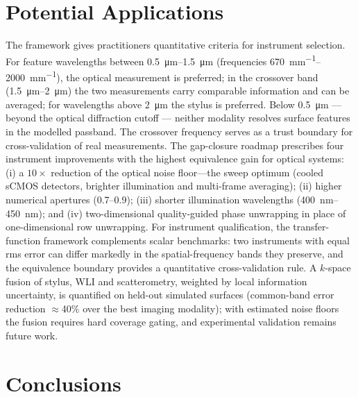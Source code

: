 \documentclass{imeko_wc}
\begin{document}
\section{Potential Applications}

\label{sec:applications}
The framework gives practitioners quantitative criteria for instrument selection. For feature wavelengths between \qtyrange{0.5}{1.5}{\micro\metre} (frequencies \qtyrange{670}{2000}{mm^{-1}}), the optical measurement is preferred; in the crossover band (\qtyrange{1.5}{2}{\micro\metre}) the two measurements carry comparable information and can be averaged; for wavelengths above \qty{2}{\micro\metre} the stylus is preferred. Below \qty{0.5}{\micro\metre} --- beyond the optical diffraction cutoff --- neither modality resolves surface features in the modelled passband. The crossover frequency serves as a trust boundary for cross-validation of real measurements. The gap-closure roadmap prescribes four instrument improvements with the highest equivalence gain for optical systems: (i) a $10\times$ reduction of the optical noise floor---the sweep optimum (cooled sCMOS detectors, brighter illumination and multi-frame averaging); (ii) higher numerical apertures (0.7--0.9); (iii) shorter illumination wavelengths (\qtyrange{400}{450}{\nano\metre}); and (iv) two-dimensional quality-guided phase unwrapping in place of one-dimensional row unwrapping. For instrument qualification, the transfer-function framework complements scalar benchmarks: two instruments with equal rms error can differ markedly in the spatial-frequency bands they preserve, and the equivalence boundary provides a quantitative cross-validation rule. A $k$-space fusion of stylus, WLI and scatterometry, weighted by local information uncertainty, is quantified on held-out simulated surfaces (common-band error reduction $\approx$40\% over the best imaging modality); with estimated noise floors the fusion requires hard coverage gating, and experimental validation remains future work.

\section{Conclusions}
\end{document}
